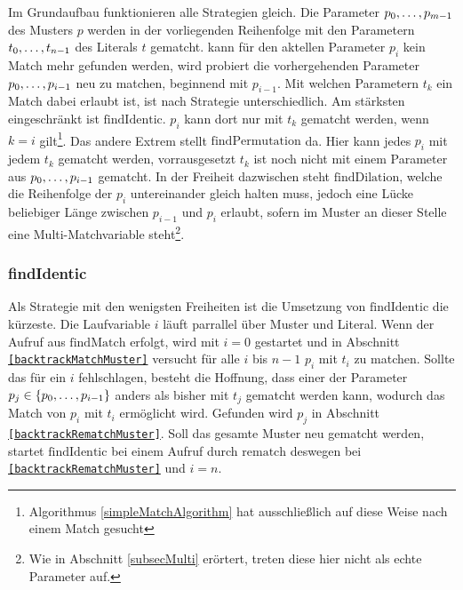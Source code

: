 \begin{algorithm}
\DontPrintSemicolon
\caption{$\mathrm{rematch} \colon M \times T \rightarrow \mathit{Bool}$}\label{rematch}
 {
     {
    }
     {
    }
     {
    }
}        
\end{algorithm}

Im Grundaufbau funktionieren alle Strategien gleich. Die Parameter ${p}_{0}, \dots, {p}_{m-1}$ des Musters $p$ werden in der vorliegenden Reihenfolge mit den Parametern ${t}_{0}, \dots, {t}_{n-1}$ des Literals $t$ gematcht. kann für den aktellen Parameter $p_i$ kein Match mehr gefunden werden, wird probiert die vorhergehenden Parameter ${p}_{0}, \dots, {p}_{i-1}$ neu zu matchen, beginnend mit $p_{i-1}$. Mit welchen Parametern $t_k$ ein Match dabei erlaubt ist, ist nach Strategie unterschiedlich. Am stärksten eingeschränkt ist $\mathrm{findIdentic}$. $p_i$ kann dort nur mit $t_k$ gematcht werden, wenn $k = i$ gilt\footnote{Algorithmus \ref{simpleMatchAlgorithm} hat ausschließlich auf diese Weise nach einem Match gesucht}. Das andere Extrem stellt $\mathrm{findPermutation}$ da. Hier kann jedes $p_i$ mit jedem $t_k$ gematcht werden, vorrausgesetzt $t_k$ ist noch nicht mit einem Parameter aus ${p}_{0}, \dots, {p}_{i-1}$ gematcht. In der Freiheit dazwischen steht $\mathrm{findDilation}$, welche die Reihenfolge der $p_i$ untereinander gleich halten muss, jedoch eine Lücke beliebiger Länge zwischen $p_{i-1}$ und $p_i$ erlaubt, sofern im Muster an dieser Stelle eine Multi-Matchvariable steht\footnote{Wie in Abschnitt \ref{subsecMulti} erörtert, treten diese hier nicht als echte Parameter auf.}.


\subsubsection {findIdentic}
Als Strategie mit den wenigsten Freiheiten ist die Umsetzung von $\mathrm{findIdentic}$ die kürzeste. Die Laufvariable $i$ läuft parrallel über Muster und Literal. Wenn der Aufruf aus $\mathrm{findMatch}$ erfolgt, wird mit $i = 0$ gestartet und in Abschnitt \texttt{\ref{backtrackMatchMuster}} versucht für alle $i$ bis $n-1$ $p_i$ mit $t_i$ zu matchen. Sollte das  für ein $i$ fehlschlagen, besteht die Hoffnung, dass einer der Parameter $p_j \in \{{p}_{0}, \dots, {p}_{i-1}\}$ anders als bisher mit $t_j$ gematcht werden kann, wodurch das Match von $p_i$ mit $t_i$ ermöglicht wird. Gefunden wird $p_j$ in Abschnitt \texttt{\ref{backtrackRematchMuster}}. 
Soll das gesamte Muster neu gematcht werden, startet $\mathrm{findIdentic}$ bei einem Aufruf durch $\mathrm{rematch}$ deswegen bei \texttt{\ref{backtrackRematchMuster}} und $i = n$.


